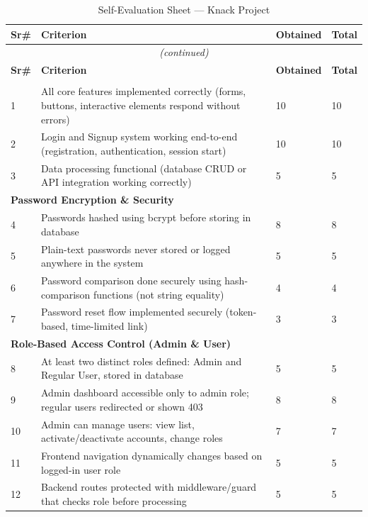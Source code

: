 \documentclass[12pt,a4paper]{article}
\begin{document}
\begin{longtable}{p{0.5cm} p{9cm} p{1.8cm} p{1.8cm}}
\caption{Self-Evaluation Sheet --- Knack Project}\\
\toprule
\textbf{Sr\#} & \textbf{Criterion} & \textbf{Obtained} & \textbf{Total} \\
\midrule
\endfirsthead
\multicolumn{4}{c}{\small\textit{(continued)}}\\
\toprule
\textbf{Sr\#} & \textbf{Criterion} & \textbf{Obtained} & \textbf{Total} \\
\midrule
\endhead
\bottomrule
\endfoot

\multicolumn{4}{l}{\textbf{Functionality}} \\[4pt]
1 & All core features implemented correctly (forms, buttons, interactive elements respond without errors) & 10 & 10 \\[4pt]
2 & Login and Signup system working end-to-end (registration, authentication, session start) & 10 & 10 \\[4pt]
3 & Data processing functional (database CRUD or API integration working correctly) & 5 & 5 \\[8pt]

\multicolumn{4}{l}{\textbf{Password Encryption \& Security}} \\[4pt]
4 & Passwords hashed using bcrypt before storing in database & 8 & 8 \\[4pt]
5 & Plain-text passwords never stored or logged anywhere in the system & 5 & 5 \\[4pt]
6 & Password comparison done securely using hash-comparison functions (not string equality) & 4 & 4 \\[4pt]
7 & Password reset flow implemented securely (token-based, time-limited link) & 3 & 3 \\[8pt]

\multicolumn{4}{l}{\textbf{Role-Based Access Control (Admin \& User)}} \\[4pt]
8  & At least two distinct roles defined: Admin and Regular User, stored in database & 5 & 5 \\[4pt]
9  & Admin dashboard accessible only to admin role; regular users redirected or shown 403 & 8 & 8 \\[4pt]
10 & Admin can manage users: view list, activate/deactivate accounts, change roles & 7 & 7 \\[4pt]
11 & Frontend navigation dynamically changes based on logged-in user role & 5 & 5 \\[4pt]
12 & Backend routes protected with middleware/guard that checks role before processing & 5 & 5 \\[8pt]


\end{longtable}
\end{document}
